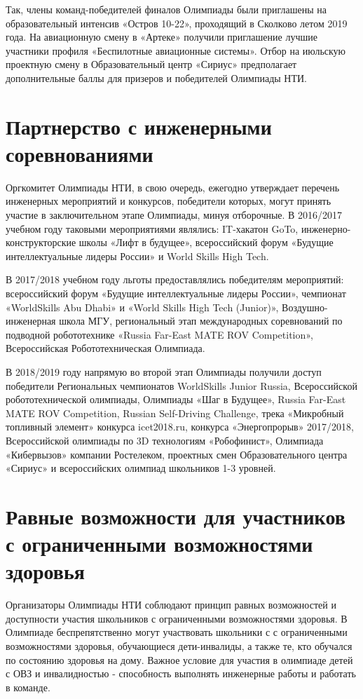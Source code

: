Так, члены команд-победителей финалов Олимпиады были приглашены на образовательный интенсив «Остров 10-22», проходящий в Сколково летом 2019 года.  На авиационную смену в «Артеке» получили приглашение лучшие участники профиля «Беспилотные авиационные системы». Отбор на июльскую проектную смену в Образовательный центр «Сириус» предполагает дополнительные баллы для призеров и победителей Олимпиады НТИ.

\section*{Партнерство с инженерными соревнованиями}

Оргкомитет Олимпиады НТИ, в свою очередь, ежегодно утверждает перечень инженерных мероприятий и конкурсов, победители которых, могут принять участие в заключительном этапе Олимпиады, минуя отборочные. В 2016/2017 учебном году таковыми мероприятиями являлись: IT-хакатон GoTo, инженерно-конструкторские школы «Лифт в будущее»,  всероссийский форум «Будущие интеллектуальные лидеры России» и World Skills High Tech. 

В 2017/2018 учебном году льготы предоставлялись победителям мероприятий: всероссийский форум «Будущие интеллектуальные лидеры России», чемпионат \linebreak «WorldSkills Abu Dhabi» и «World Skills High Tech (Junior)», Воздушно-инженерная школа МГУ, региональный этап международных соревнований по подводной робототехнике «Russia Far-East MATE ROV Competition», Всероссийская Робототехническая Олимпиада.

В 2018/2019 году напрямую во второй этап Олимпиады получили доступ победители Региональных чемпионатов WorldSkills Junior Russia, Всероссийской робототехнической олимпиады, Олимпиады «Шаг в Будущее», Russia Far-East MATE ROV Competition, Russian Self-Driving Challenge, трека «Микробный топливный элемент» конкурса icet2018.ru, конкурса «Энергопрорыв» 2017/2018, Всероссийской олимпиады по 3D технологиям «Робофинист», Олимпиада «Кибервызов» компании Ростелеком, проектных смен Образовательного центра «Сириус» и всероссийских олимпиад школьников 1-3 уровней.

\section*{Равные возможности для участников с  ограниченными возможностями здоровья}

Организаторы Олимпиады НТИ соблюдают принцип равных возможностей и доступности участия школьников с ограниченными возможностями здоровья. В Олимпиаде беспрепятственно могут участвовать школьники с с ограниченными возможностями здоровья, обучающиеся дети-инвалиды, а также те, кто обучался по состоянию здоровья на дому. Важное условие для участия в олимпиаде детей с ОВЗ и инвалидностью - способность выполнять инженерные работы и работать в команде.

